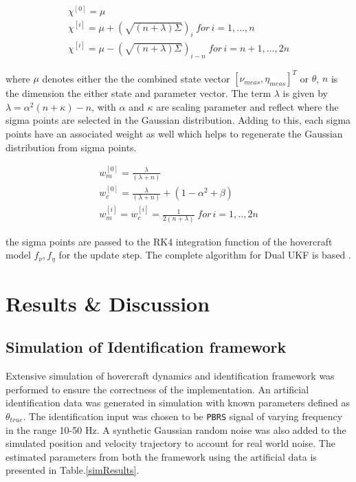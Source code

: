 \documentclass[12pt,titlepage]{article}
\begin{document}
\begin{gather}
\chi^{[0]} = \mu \\
\chi^{[i]} = \mu + (\sqrt{(n+\lambda)\Sigma})_i \hspace{3pt} for \hspace{2pt}i=1,...,n \\
\chi^{[i]} = \mu - (\sqrt{(n+\lambda)\Sigma})_{i-n} \hspace{3pt} for \hspace{2pt}i=n+1,...,2n
\end{gather}

where $\mu$ denotes either the the combined state vector $[\nu_{meas},\eta_{meas}]^T$ or $\theta$, $n$ is the dimension the either state and parameter vector. The term $\lambda$ is given by $\lambda = \alpha^2(n+\kappa)-n$, with $\alpha$ and $\kappa$ are scaling parameter and reflect where the sigma points are selected in the Gaussian distribution. Adding to this, each sigma points have an associated weight as well which helps to regenerate the Gaussian distribution from sigma points.
  
\begin{gather}
w_m^{[0]} = \frac{\lambda}{(\lambda+n)} \\
w_c^{[0]} = \frac{\lambda}{(\lambda+n)} + (1-\alpha^2+\beta) \\
w_m^{[i]} = w_c^{[i]} = \frac{1}{2(n+\lambda)} \hspace{3pt}for \hspace{2pt}i = 1,..,2n 
\end{gather}

the sigma points are passed to the RK4 integration function of the hovercraft model $f_\nu, f_\eta$ for the update step. The complete algorithm for Dual UKF is based \cite{Thrun}.

\section{Results \& Discussion}
\subsection{Simulation of Identification framework}
Extensive simulation of hovercraft dynamics and identification framework was performed to ensure the correctness of the implementation. An artificial identification data was generated in simulation with known parameters defined as $\theta_{true}$. The identification input was chosen to be \texttt{PBRS} signal of varying frequency in the range 10-50 Hz. A synthetic Gaussian random noise was also added to the simulated position and velocity trajectory to account for real world noise. The estimated parameters from both the framework using the artificial data is presented in Table.\ref{simResults}.
\end{document}

